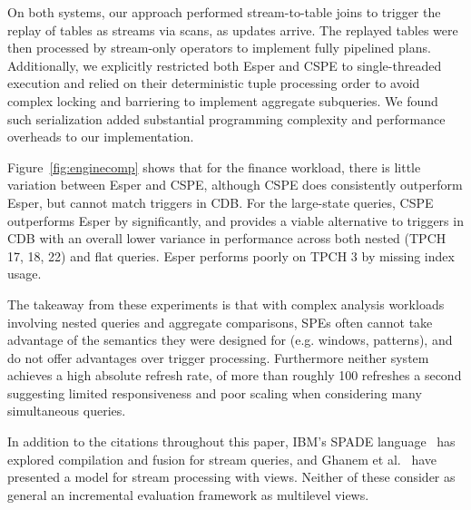 On both systems, our approach performed stream-to-table joins to trigger the
replay of tables as streams via scans, as updates arrive. The replayed tables
were then processed by stream-only operators to implement fully pipelined plans.
Additionally, we explicitly restricted both Esper and CSPE to single-threaded
execution and relied on their deterministic tuple processing order to avoid
complex locking and barriering to implement aggregate subqueries. We found such
serialization added substantial programming complexity and performance overheads
to our implementation.

Figure~\ref{fig:enginecomp} shows that for the finance workload, there is little
variation between Esper and CSPE, although CSPE does consistently outperform
Esper, but cannot match triggers in CDB. For the large-state queries, CSPE
outperforms Esper by significantly, and provides a viable alternative to
triggers in CDB with an overall lower variance in performance across both
nested (TPCH 17, 18, 22) and flat queries. Esper performs poorly on
TPCH 3 by missing index usage.

The takeaway from these experiments is that with complex analysis workloads
involving nested queries and aggregate comparisons, SPEs often cannot take
advantage of the semantics they were designed for (e.g. windows, patterns), and
do not offer advantages over trigger processing. Furthermore neither system
achieves a high absolute refresh rate, of more than roughly 100 refreshes a
second suggesting limited responsiveness and poor scaling when considering many
simultaneous queries.

 In addition to the citations throughout this
paper, IBM's SPADE language~\cite{gedik-sigmod:08} has explored compilation and
fusion for stream queries, and Ghanem et
al.~\cite{DBLP:journals/tods/GhanemELA10} have presented a model for stream
processing with views. Neither of these consider as
general an incremental evaluation framework as multilevel views.
